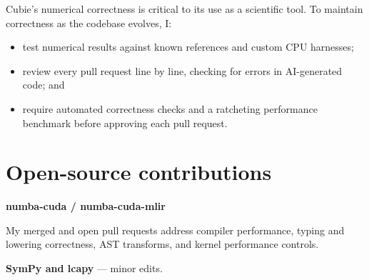 \documentclass[11pt,a4paper]{article}
\begin{document}
Cubie's numerical correctness is critical to its use as a scientific tool.
To maintain correctness as the codebase evolves, I:

\begin{itemize}
  \item test numerical results against known references and custom CPU harnesses;
  \item review every pull request line by line, checking for errors in AI-generated code; and
  \item require automated correctness checks and a ratcheting performance benchmark
    before approving each pull request.
\end{itemize}

\section{Open-source contributions}
\textbf{numba-cuda / numba-cuda-mlir}\par
My merged and open pull requests address compiler performance, typing and
lowering correctness, AST transforms, and kernel performance controls.

\textbf{SymPy and lcapy} --- minor edits.
\end{document}
